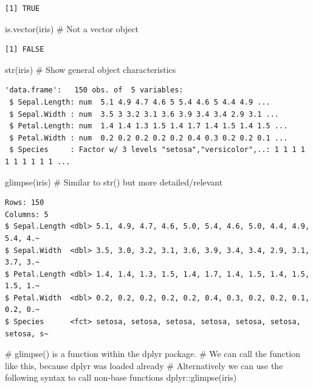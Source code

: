 \documentclass[
  letterpaper,
  DIV=11,
  numbers=noendperiod]{scrreprt}
\newenvironment{Shaded}{\begin{snugshade}}{\end{snugshade}}
\newcommand{\CommentTok}[1]{\textcolor[rgb]{0.37,0.37,0.37}{#1}}
\newcommand{\FunctionTok}[1]{\textcolor[rgb]{0.28,0.35,0.67}{#1}}
\newcommand{\NormalTok}[1]{\textcolor[rgb]{0.00,0.23,0.31}{#1}}
\newcommand{\SpecialCharTok}[1]{\textcolor[rgb]{0.37,0.37,0.37}{#1}}
\begin{document}
\begin{verbatim}
[1] TRUE
\end{verbatim}

\begin{Shaded}
\begin{Highlighting}[]
\FunctionTok{is.vector}\NormalTok{(iris) }\CommentTok{\# Not a vector object}
\end{Highlighting}
\end{Shaded}

\begin{verbatim}
[1] FALSE
\end{verbatim}

\begin{Shaded}
\begin{Highlighting}[]
\FunctionTok{str}\NormalTok{(iris) }\CommentTok{\# Show general object characteristics}
\end{Highlighting}
\end{Shaded}

\begin{verbatim}
'data.frame':   150 obs. of  5 variables:
 $ Sepal.Length: num  5.1 4.9 4.7 4.6 5 5.4 4.6 5 4.4 4.9 ...
 $ Sepal.Width : num  3.5 3 3.2 3.1 3.6 3.9 3.4 3.4 2.9 3.1 ...
 $ Petal.Length: num  1.4 1.4 1.3 1.5 1.4 1.7 1.4 1.5 1.4 1.5 ...
 $ Petal.Width : num  0.2 0.2 0.2 0.2 0.2 0.4 0.3 0.2 0.2 0.1 ...
 $ Species     : Factor w/ 3 levels "setosa","versicolor",..: 1 1 1 1 1 1 1 1 1 1 ...
\end{verbatim}

\begin{Shaded}
\begin{Highlighting}[]
\FunctionTok{glimpse}\NormalTok{(iris) }\CommentTok{\# Similar to str() but more detailed/relevant}
\end{Highlighting}
\end{Shaded}

\begin{verbatim}
Rows: 150
Columns: 5
$ Sepal.Length <dbl> 5.1, 4.9, 4.7, 4.6, 5.0, 5.4, 4.6, 5.0, 4.4, 4.9, 5.4, 4.~
$ Sepal.Width  <dbl> 3.5, 3.0, 3.2, 3.1, 3.6, 3.9, 3.4, 3.4, 2.9, 3.1, 3.7, 3.~
$ Petal.Length <dbl> 1.4, 1.4, 1.3, 1.5, 1.4, 1.7, 1.4, 1.5, 1.4, 1.5, 1.5, 1.~
$ Petal.Width  <dbl> 0.2, 0.2, 0.2, 0.2, 0.2, 0.4, 0.3, 0.2, 0.2, 0.1, 0.2, 0.~
$ Species      <fct> setosa, setosa, setosa, setosa, setosa, setosa, setosa, s~
\end{verbatim}

\begin{Shaded}
\begin{Highlighting}[]
\CommentTok{\# glimpse() is a function within the dplyr package. }
\CommentTok{\# We can call the function like this, because dplyr was loaded already}
\CommentTok{\# Alternatively we can use the following syntax to call non{-}base functions}
\NormalTok{dplyr}\SpecialCharTok{::}\FunctionTok{glimpse}\NormalTok{(iris)}
\end{Highlighting}
\end{Shaded}
\end{document}
